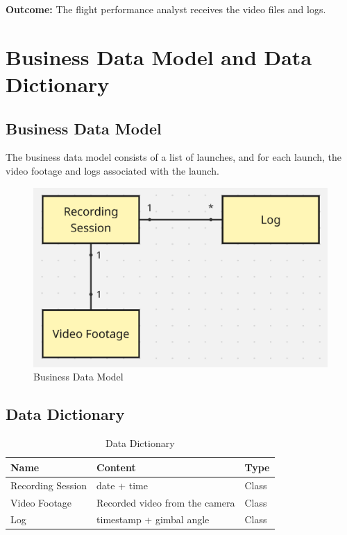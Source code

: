 \documentclass[12pt]{article}
\begin{document}
\textbf{Outcome:} The flight performance analyst receives the video files and logs.

\section{Business Data Model and Data Dictionary}
\subsection{Business Data Model}

The business data model consists of a list of launches, and for each launch,
the video footage and logs associated with the launch.

\begin{figure}[H]
  \centering
  \includegraphics[width=\textwidth,height=\textheight,keepaspectratio]{../Images/business_data_model.png}
  \caption{Business Data Model}
  \label{img:business-data-model}
\end{figure}

\subsection{Data Dictionary}

\begin{table}[H]
  \centering
  \setlength\extrarowheight{5mm}
  \begin{tabularx}{\textwidth}{lXp{1in}}
    \toprule \textbf{Name} & \textbf{Content}               &
    \textbf{Type}                                             \\
    \midrule
    Recording Session      & date + time                    &
    Class
    \\
    Video Footage          & Recorded video from the camera &
    Class
    \\
    Log                    & timestamp + gimbal angle       &
    Class
    \\
    \bottomrule
  \end{tabularx}
  \caption{Data Dictionary}
  \label{tab:data-dictionary}
\end{table}
\end{document}

